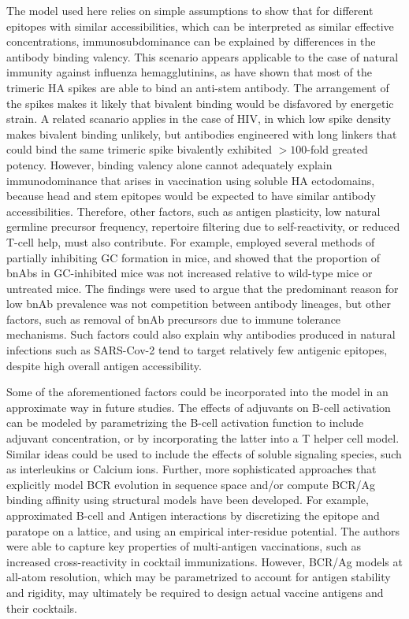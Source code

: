 \documentclass[utf8]{frontiersHLTH}%
\newcommand{\cred}[1]{\textsf{\color{red}#1}}
\begin{document}
\cred{The model used here relies on simple assumptions to show that for different
epitopes with similar accessibilities, which can be interpreted as
similar effective concentrations, immunosubdominance can be explained by
differences in the antibody binding valency. This scenario appears
applicable to the case of  natural immunity against influenza
hemagglutinins, as \citet{harris13} have shown that most of the trimeric
HA spikes are able to bind an anti-stem antibody. The arrangement of the
spikes makes it likely that bivalent binding would be disfavored by energetic
strain.\cite{harris13,amitai20} A related scanario applies in the
case of HIV, in which low spike density makes bivalent binding unlikely,
but antibodies engineered with long linkers  that could bind the same
trimeric spike bivalently exhibited $>100$-fold greated potency.\cite{galimidi15}
}
%
\cred{
However, binding valency alone cannot adequately explain immunodominance 
that arises in vaccination using soluble HA ectodomains, because
head and stem epitopes would be expected to have similar antibody accessibilities.
Therefore, other factors, such as antigen plasticity, low natural germline
precursor frequency, repertoire filtering due to self-reactivity, or
reduced T-cell help,\cite{erwin20} must also contribute.
}
%
\cred{For example, \citet{keating20} employed several methods of partially inhibiting GC
formation in mice, and showed that the proportion of bnAbs in GC-inhibited
mice was not increased relative to wild-type mice or untreated mice. The
findings were used to argue that the predominant reason for low bnAb
prevalence was not competition between antibody lineages, but other
factors, such as removal of bnAb precursors due to immune tolerance
mechanisms.\cite{keating20} Such factors could also explain
why antibodies produced in natural infections such as SARS-Cov-2 tend to target relatively
few antigenic epitopes, despite high overall antigen accessibility.\cite{barnes20}}

Some of the aforementioned factors could be incorporated into the model
in an approximate way in future studies.
%
\cred{The effects of adjuvants on B-cell activation can be modeled by
parametrizing the B-cell activation function to include
adjuvant concentration, or by incorporating the latter into a T helper cell model.
Similar ideas could be used to include the effects of soluble signaling
species, such as interleukins or Calcium ions.}
%
\cred{Further, more sophisticated approaches that explicitly model BCR evolution in
sequence space and/or compute BCR/Ag binding affinity using structural models have been developed.
For example, \citet{robert21}
approximated B-cell and Antigen interactions by discretizing the epitope
and paratope on a lattice, and using an empirical inter-residue
potential.\cite{robert21} The authors were able to capture key properties 
of multi-antigen vaccinations, such as increased cross-reactivity in
cocktail immunizations.}
%
\cred{
However, BCR/Ag models at all-atom resolution,\cite{conti21,sprenger21}
which may be parametrized to account for antigen stability and rigidity,
may ultimately be required to design actual vaccine antigens and their
cocktails.
}
\end{document}
